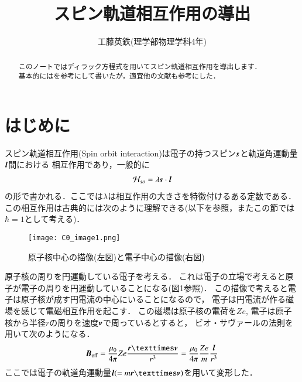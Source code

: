 \documentclass[a4paper,11pt]{jsarticle}
\numberwithin{equation}{section}
\newcommand{\bvec}[1]{\mbox{\boldmath $#1$}}
\begin{document}
\title{スピン軌道相互作用の導出}
\author{工藤英鉄(理学部物理学科4年)}
\date{}
\maketitle

\setcounter{section}{0}

\begin{abstract}
  このノートではディラック方程式を用いてスピン軌道相互作用を導出します．\\
  基本的には\cite{II}を参考にして書いたが，適宜他の文献も参考にした．
\end{abstract} 

\section{はじめに}
スピン軌道相互作用(Spin orbit interaction)は電子の持つスピン$\bvec{s}$と軌道角運動量$\bvec{l}$間における
相互作用であり，一般的に
\begin{align}
  \mathcal{H} _{so} =\lambda \bvec{s}\cdot \bvec{l}
\end{align}
の形で書かれる．ここでは$\lambda$は相互作用の大きさを特徴付けるある定数である．
この相互作用は古典的には次のように理解できる(以下\cite{soi}を参照，またこの節では$\hbar=1$として考える)．

\begin{wrapfigure}{r}[0pt]{0.4\textwidth}
  \centering
    \texttt{[image: C0\_image1.png]}
  \caption{原子核中心の描像(左図)と電子中心の描像(右図)}
  \label{fig:1}
 \end{wrapfigure}

原子核の周りを円運動している電子を考える．
これは電子の立場で考えると原子が電子の周りを円運動していることになる(図1参照)．
この描像で考えると電子は原子核が成す円電流の中心にいることになるので，
電子は円電流が作る磁場を感じて電磁相互作用を起こす．
この磁場は原子核の電荷を$Ze$, 電子は原子核から半径$r$の周りを速度$\bvec{v}$で周っているとすると，
ビオ・サヴァールの法則を用いて次のようになる．
\begin{align}
  \bvec{B}_{\text{eff}} =\frac{\mu_0}{4\pi}Ze\frac{\bvec{r}×\bvec{v}}{r^3} 
  = \frac{\mu_0}{4\pi}\frac{Ze}{m}\frac{ \bvec{l}}{r^3}
\end{align}
ここでは電子の軌道角運動量$\bvec{l}(=m\bvec{r}×\bvec{v})$を用いて変形した．
\end{document}
